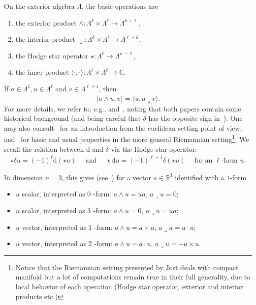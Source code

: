 \documentclass[10pt]{amsart}
\theoremstyle{definition}\newtheorem{defi}[theo]{Definition}\newtheorem{rema}[theo]{Remark}\newtheorem{exam}[theo]{Example}\newtheorem{exem}[theo]{Example}\newtheorem{nota}[theo]{Notation}
\newcommand{\bbR}{\mathbb{R}}
\newcommand{\bbC}{\mathbb{C}}
\newcommand{\rmd}{\mathrm{d}}
\newcommand*{\romanenumi}{\renewcommand*{\theenumi}{\roman{enumi}}}
\begin{document}
On the exterior algebra $\Lambda$, the basic operations are
\begin{enumerate}\romanenumi
\item the exterior product $\wedge: \Lambda^{k} \times \Lambda^{\ell} \rightarrow \Lambda^{k+\ell}$,
\item the interior product $\lrcorner: \Lambda^{k} \times \Lambda^{\ell} \rightarrow \Lambda^{\ell-k}$,
\item the Hodge star operator $\star: \Lambda^{\ell} \rightarrow \Lambda^{n-\ell}$,
\item the inner product $\langle\cdot, \cdot\rangle: \Lambda^{\ell} \times \Lambda^{\ell} \rightarrow \bbC$.
\end{enumerate}
If $a \in \Lambda^{1}, u \in \Lambda^{\ell}$ and $v \in \Lambda^{\ell+1}$, then
\begin{align*}
\langle a \wedge u, v\rangle=\langle u, a\lrcorner v\rangle.
\end{align*}
For more details, we refer to, e.g., \cite[Section~2]{AxelssonMcIntosh2004} and~\cite[Section~3]{CostabelMcIntosh2010}, noting that both papers contain some historical background (and being careful that ${\delta}$ has the opposite sign in~\cite{AxelssonMcIntosh2004}). One may also consult~\cite{DoCarmo1994} for an introduction from the euclidean setting point of view, and~\cite[Section~1-3]{Jost2011} for basic and usual properties in the more general Riemannian setting\footnote{Notice that the Riemannian setting presented by Jost deals with compact manifold but a lot of computations remain true in their full generality, due to local behavior of each operation (Hodge star operator, exterior and interior products etc.)}. We recall the relation between $\rmd$ and ${\delta}$ via the Hodge star operator:
\begin{align*}
\star {\delta} u=(-1)^{\ell} \rmd(\star u) \quad\text{ and }\quad \star \rmd u=(-1)^{\ell-1} {\delta}(\star u) \quad\text{ for an }\ell\text{-form }u.
\end{align*}

In dimension $n=3$, this gives (see~\cite{CostabelMcIntosh2010}) for a vector $a \in \bbR^{3}$ identified with a $1$-form
\begin{itemize}
\item $u$ scalar, interpreted as 0 -form: $a \wedge u=u a$, $a\lrcorner u=0$;
\item $u$ scalar, interpreted as 3 -form: $a \wedge u=0$, $a\lrcorner u=u a$;
\item $u$ vector, interpreted as 1 -form: $a \wedge u=a \times u$, $a\lrcorner u=a \cdot u$;
\item $u$ vector, interpreted as 2 -form: $a \wedge u=a \cdot u$, $a\lrcorner u=-a \times u$.
\end{itemize}
\end{document}

